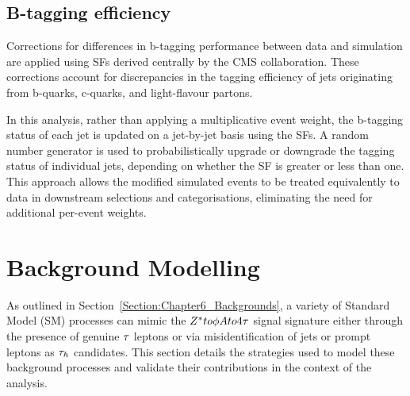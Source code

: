 \subsection{B-tagging efficiency}

Corrections for differences in b-tagging performance between data and simulation are applied using SFs derived centrally by the CMS collaboration. These corrections account for discrepancies in the tagging efficiency of jets originating from b-quarks, c-quarks, and light-flavour partons.

In this analysis, rather than applying a multiplicative event weight, the b-tagging status of each jet is updated on a jet-by-jet basis using the SFs. A random number generator is used to probabilistically upgrade or downgrade the tagging status of individual jets, depending on whether the SF is greater or less than one. This approach allows the modified simulated events to be treated equivalently to data in downstream selections and categorisations, eliminating the need for additional per-event weights.



\section{Background Modelling}
\label{Section:Chapter6_Background_Modelling}

As outlined in Section~\ref{Section:Chapter6_Backgrounds}, a variety of Standard Model (SM) processes can mimic the $Z^* to \phi A to 4\tau$ signal signature either through the presence of genuine $\tau$ leptons or via misidentification of jets or prompt leptons as $\tau_h$ candidates. This section details the strategies used to model these background processes and validate their contributions in the context of the analysis.

